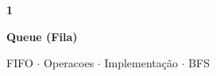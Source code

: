\documentclass[aspectratio=169,10pt]{beamer}
\begin{document}
{
\begin{frame}[noframenumbering]
  \centering\vspace{1.2cm}
  {\fontsize{38}{46}\selectfont\bfseries\color{gemaBlue} 1}\par
  \vspace{0.25cm}
  {\Large\color{gemaCyan}\bfseries Queue (Fila)}\par
  \vspace{0.15cm}
  {\color{gray}\small FIFO $\cdot$ Operacoes $\cdot$ Implementação $\cdot$ BFS}
\end{frame}
}

\end{document}
